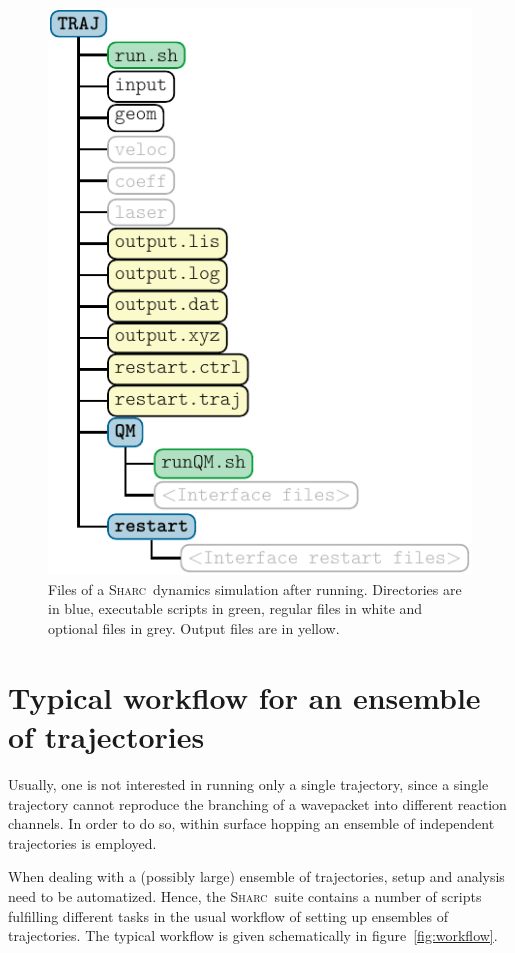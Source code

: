 \documentclass[a4paper,11pt,DIV=15,openany,twoside=false]{scrbook}
\newcommand{\sharc}{\textsc{Sharc}}
\begin{document}
\begin{figure}[h!]
  \centering
  \includegraphics[scale=1]{img/dir_traj/dir_traj_after.pdf}
  \caption{Files of a \sharc\ dynamics simulation after running. Directories are in blue, executable scripts in green, regular files in white and optional files in grey. Output files are in yellow.}
  \label{fig:dir_traj_after}
\end{figure}

\section{Typical workflow for an ensemble of trajectories}

Usually, one is not interested in running only a single trajectory, since a single trajectory cannot reproduce the branching of a wavepacket into different reaction channels. In order to do so, within surface hopping an ensemble of independent trajectories is employed. 

When dealing with a (possibly large) ensemble of trajectories, setup and analysis need to be automatized. Hence, the \sharc\ suite contains a number of scripts fulfilling different tasks in the usual workflow of setting up ensembles of trajectories.
The typical workflow is given schematically in figure~\ref{fig:workflow}.
\end{document}
